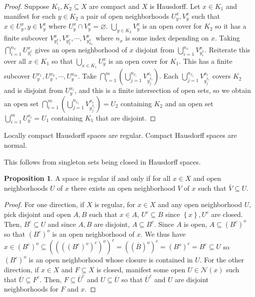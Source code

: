 \documentclass[12pt,reqno]{amsart}
\numberwithin{theorem}{section}
\theoremstyle{definition}
\theoremstyle{remark}
\numberwithin{equation}{section}
\newcommand{\set}[1]{\left \{ #1 \right \}}
\theoremstyle{definition}
\newtheorem{prop}[theorem]{Proposition}
\begin{document}
\begin{proof}
    Suppose $K_1,K_2 \subseteq X$ are compact and $X$ is Hausdorff. Let $x \in K_1$ and manifest for each $y \in K_2$ a pair of open neighborhoods $U_y^x,V_y^x$ such that $x \in U_y^x,y \in V_y^x$ where $U_y^x \cap V_y^x = \varnothing$. $\bigcup_{y\in K_2} V_y^x$ is an open cover for $K_2$ so it has a finite subcover $V_{y_{1}^x}^x,V_{y_{2}^x}^x,\cdots,V_{y_{{n_x}}^x}^x$ where ${n_x}$ is some index depending on $x$. Taking $\bigcap_{i=1}^{n_x}U_{y_{i}^x}^x$ gives an open neighborhood of $x$ disjoint from $\bigcup_{i=1}^{n_x} V_{y_{i}^x}^x$. Reiterate this over all $x \in K_1$ so that $\bigcup_{x \in K_1} U_y^{x}$ is an open cover for $K_1$. This has a finite subcover $U_y^{x_1},U_y^{x_2},\cdots ,U_y^{x_m}$. Take $\bigcap_{i=1}^m \left (\bigcup_{j=1}^{n_{x_i}} V_{y_{j}^{x_i}}^{x_i} \right ) $. Each $\bigcup_{j=1}^{n_{x_i}} V_{y_{j}^{x_i}}^{x_i} $ covers $K_2$ and is disjoint from $U_{y}^{x_i}$, and this is a finite intersection of open sets, so we obtain an open set $\bigcap_{i=1}^m \left (\bigcup_{j=1}^{n_{x_i}} V_{y_{j}^{x_i}}^{x_i} \right )=U_2$ containing $K_2$ and an open set $\bigcup_{i=1}^m U_y^{x_i} = U_1$ containing $K_1$ that are disjoint.
\end{proof}
\begin{corollary}
    Locally compact Hausdorff spaces are regular. Compact Hausdorff spaces are normal.
\end{corollary}
This follows from singleton sets being closed in Hausdorff spaces.
\begin{prop}
    A space is regular if and only if for all $x \in X$ and open neighborhoods $U$ of $x$ there exists an open neighborhood $V$ of $x$ such that $\overline V \subseteq U$. 
\end{prop}
\begin{proof}
     For one direction, if $X$ is regular, for $x \in X$ and any open neighborhood $U$, pick disjoint and open $A,B$ such that $x \in A$, $U^c \subseteq B$ since $\set x, U^c$ are closed. Then, $B^c \subseteq U$ and since $A, B$ are disjoint, $A \subseteq B^c$. Since $A$ is open, $A \subseteq (B^c)^o$ so that $(B^c)^o$ is an open neighborhood of $x$. We thus have $x \in (B^c)^o \subseteq ((((B^c)^o)^c)^o)^c = ((\overline B)^o)^c = (B^o)^c= B^c \subseteq U$ so $(B^c)^o$ is an open neighborhood whose closure is contained in $U$. For the other direction, if $x \in X$ and $F\subseteq X$ is closed, manifest some open $U \in \mathcal N(x)$ such that $\overline U \subseteq F^c$. Then, $F \subseteq \overline U^c$ and $U\subseteq \overline U$ so that $\overline U^c$ and $U$ are disjoint neighborhoods for $F$ and $x$.
\end{proof}
\end{document}
